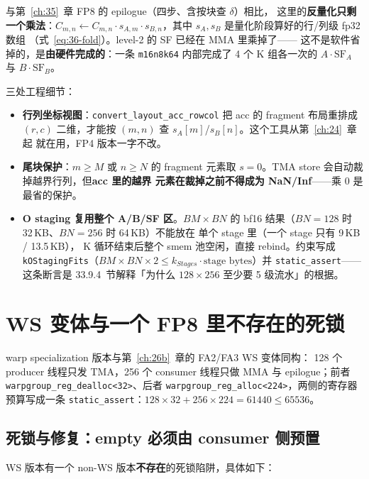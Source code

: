 与第~\ref{ch:35}~章 FP8 的 epilogue（四步、含按块查 $\delta$）相比，
这里的\textbf{反量化只剩一个乘法}：$C_{m,n} \leftarrow C_{m,n}\cdot
s_{A,m}\cdot s_{B,n}$，其中 $s_A,s_B$ 是量化阶段算好的行/列级 fp32 数组
（式~\ref{eq:36-fold}）。level-2 的 SF 已经在 MMA 里乘掉了——
这不是软件省掉的，是\textbf{由硬件完成的}：一条
\texttt{m16n8k64} 内部完成了 4 个 K 组各一次的 $A\cdot\mathrm{SF}_A$ 与
$B\cdot\mathrm{SF}_B$。

三处工程细节：

\begin{itemize}[itemsep=2pt,topsep=3pt]
  \item \textbf{行列坐标视图}：\texttt{convert\_layout\_acc\_rowcol}
        把 acc 的 fragment 布局重排成 $(r,c)$ 二维，才能按
        $(m,n)$ 查 $s_A[m]$/$s_B[n]$。这个工具从第~\ref{ch:24}~章起
        就在用，FP4 版本一字不改。
  \item \textbf{尾块保护}：$m\ge M$ 或 $n\ge N$ 的 fragment 元素取
        $s=0$。TMA store 会自动裁掉越界行列，但\textbf{acc 里的越界
        元素在裁掉之前不得成为 NaN/Inf}——乘 0 是最省的保护。
  \item \textbf{O staging 复用整个 A/B/SF 区}。$BM\times BN$ 的 bf16
        结果（$BN{=}128$ 时 32\,KB、$BN{=}256$ 时 64\,KB）不能放在
        单个 stage 里（一个 stage 只有 9\,KB / 13.5\,KB），
        K 循环结束后整个 smem 池空闲，直接 rebind。约束写成
        \texttt{kOStagingFits}（$BM\times BN\times 2 \le k_{Stages}\cdot
        \text{stage bytes}$）并 \texttt{static\_assert}——这条断言是
        33.9.4~节解释「为什么 $128\times256$ 至少要 5 级流水」的根据。
\end{itemize}

\section{WS 变体与一个 FP8 里不存在的死锁}\label{sec:37-ws}

warp specialization 版本与第~\ref{ch:26b}~章的 FA2/FA3 WS 变体同构：
128 个 producer 线程只发 TMA，256 个 consumer 线程只做 MMA 与
epilogue；前者 \texttt{warpgroup\_reg\_dealloc<32>}、后者
\texttt{warpgroup\_reg\_alloc<224>}，两侧的寄存器预算写成一条
\texttt{static\_assert}：$128\times32 + 256\times224 = 61440\le 65536$。

\subsection{死锁与修复：empty 必须由 consumer 侧预置}

WS 版本有一个 non-WS 版本\textbf{不存在}的死锁陷阱，具体如下：

